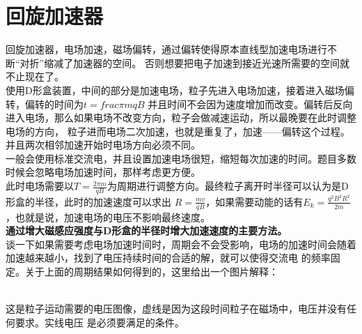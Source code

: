 \documentclass[a4paper, 12pt]{article}
\begin{document}
\section{回旋加速器}
回旋加速器，电场加速，磁场偏转，通过偏转使得原本直线型加速电场进行不断“对折”缩减了加速器的空间。
否则想要把电子加速到接近光速所需要的空间就不止现在了。\\
使用D形盒装置，中间的部分是加速电场，粒子先进入电场加速，接着进入磁场偏转，偏转的时间为$t=frac{\pi m}{qB}$
并且时间不会因为速度增加而改变。偏转后反向进入电场，那么如果电场不改变方向，粒子会做减速运动，所以最晚要在此时调整电场的方向，
粒子进而电场二次加速，也就是重复了，加速——偏转这个过程。并且两次相邻加速开始时电场方向必须不同。\\
一般会使用标准交流电，并且设置加速电场很短，缩短每次加速的时间。题目多数时候会忽略电场加速时间，那样考虑更方便。\\
此时电场需要以$T=\frac{2\pi m}{qB}$为周期进行调整方向。最终粒子离开时半径可以认为是D形盒的半径，此时的加速速度可以求出
$R=\frac{mv}{qB}$，如果需要动能的话有$E_k=\frac{q^2B^2R^2}{2m}$，也就是说，加速电场的电压不影响最终速度。\\
\textbf{通过增大磁感应强度与D形盒的半径时增大加速速度的主要方法。}\\
谈一下如果需要考虑电场加速时间时，周期会不会受影响，电场的加速时间会随着加速越来越小，找到了电压持续时间的合适的解，就可以使得交流电
的频率固定。关于上面的周期结果如何得到的，这里给出一个图片解释：\\
\\
这是粒子运动需要的电压图像，虚线是因为这段时间粒子在磁场中，电压并没有任何要求。实线电压
是必须要满足的条件。\\
\end{document}
